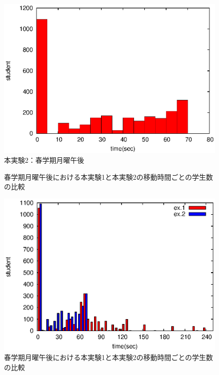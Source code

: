 \documentclass[12pt, a4paper, fleqn]{jreport}
\begin{document}
\begin{figure}[htpb]
\begin{minipage}{0.5\hsize}
\begin{center}
\includegraphics[bb=0 0 390 248,clip,width=\hsize]{oMo345_2_hist.eps}   
本実験2：春学期月曜午後
\end{center}                                    
\end{minipage}                                 
\caption{春学期月曜午後における本実験1と本実験2の移動時間ごとの学生数の比較}                              
\label{hikaku1-2}                                
\end{figure}                                 
\fi

\begin{figure}[thpb]
 \begin{center}
 \hspace{5mm} 
\includegraphics[bb=0 0 390 248,clip,scale=1.0]{omonagahist.eps}
 \hspace{-10mm} 
\vspace{-5mm}
\caption{春学期月曜午後における本実験1と本実験2の移動時間ごとの学生数の比較}                              
  \label{hikaku1-2}
 \end{center}
\end{figure}
\end{document}

